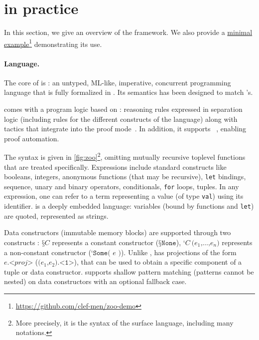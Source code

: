 \section{\Zoo in practice}
\label{sec:zoo}



In this section, we give an overview of the framework.
We also provide a \href{https://github.com/clef-men/zoo-demo}{minimal example}\footnote{\url{https://github.com/clef-men/zoo-demo}} demonstrating its use.

\paragraph{Language.}

The core of \Zoo is \ZooLang: an untyped, ML-like, imperative, concurrent programming language that is fully formalized in \Rocq.
Its semantics has been designed to match \OCaml's.

\ZooLang comes with a program logic based on \Iris : reasoning rules expressed in separation logic (including rules for the different constructs of the language) along with \Rocq tactics that integrate into the \Iris proof mode~\cite{DBLP:conf/popl/KrebbersTB17,DBLP:journals/pacmpl/KrebbersJ0TKTCD18}.
In addition, it supports \Diaframe~\cite{DBLP:conf/pldi/MulderKG22}, enabling proof automation.

The \ZooLang syntax is given in \cref{fig:zoo}\footnote{More precisely, it is the syntax of the surface language, including many \Rocq notations.}, omitting mutually recursive toplevel functions that are treated specifically.
Expressions include standard constructs like booleans, integers, anonymous functions (that may be recursive), \texttt{let} bindings, sequence, unary and binary operators, conditionals, \texttt{for} loops, tuples.
In any expression, one can refer to a \Rocq term representing a \ZooLang value (of type \texttt{val}) using its \Rocq identifier.
\ZooLang is a deeply embedded language: variables (bound by functions and \texttt{let}) are quoted, represented as strings.

Data constructors (immutable memory blocks) are supported through two constructs : $\texttt{§}C$ represents a constant constructor (\eg $\texttt{§}\texttt{None}$), $\texttt{‘} C\ \texttt{(} e_1 \texttt{,} \dots \texttt{,} e_n \texttt{)}$ represents a non-constant constructor (\eg $\texttt{‘} \texttt{Some( } e \texttt{ )}$).
Unlike \OCaml, \ZooLang has projections of the form $e \texttt{.<} \mathit{proj} \texttt{>}$ (\eg $\texttt{(} e_1 \texttt{,} e_2 \texttt{).<1>}$), that can be used to obtain a specific component of a tuple or data constructor.
\ZooLang supports shallow pattern matching (patterns cannot be nested) on data constructors with an optional fallback case.

